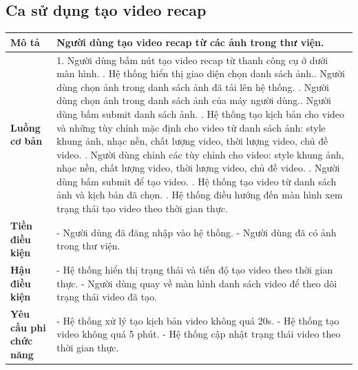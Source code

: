 \subsection{Ca sử dụng tạo video recap}

\vspace{0.5cm}

\noindent 
\begin{tabularx}{\linewidth}{| l | X |} 
\hline 
\textbf{Mô tả} & Người dùng tạo video recap từ các ảnh trong thư viện. \\
\hline 
\textbf{Luồng cơ bản} & 1. Người dùng bấm nút tạo video recap từ thanh công cụ ở dưới màn hình. \newline
                       2. Hệ thống hiển thị giao diện chọn danh sách ảnh.\newline
                       3. Người dùng chọn ảnh trong danh sách ảnh đã tải lên hệ thống. \newline
                       4. Người dùng chọn ảnh trong danh sách ảnh của máy người dùng.\newline
                       5. Người dùng bấm submit danh sách ảnh. \newline
                       6. Hệ thống tạo kịch bản cho video và những tùy chỉnh mặc định cho video từ danh sách ảnh: style khung ảnh, nhạc nền, chất lượng video, thời lượng video, chủ đề video. \newline
                       7. Người dùng chỉnh các tùy chỉnh cho video: style khung ảnh, nhạc nền, chất lượng video, thời lượng video, chủ đề video. \newline
                       8. Người dùng bấm submit để tạo video. \newline
                       9. Hệ thống tạo video từ danh sách ảnh và kịch bản đã chọn. \newline
                       10. Hệ thống điều hướng đến màn hình xem trạng thái tạo video theo thời gian thực. \\
\hline 
\textbf{Tiền điều kiện} & - Người dùng đã đăng nhập vào hệ thống. \newline
                            - Người dùng đã có ảnh trong thư viện. \\
\hline
\textbf{Hậu điều kiện} & - Hệ thống hiển thị trạng thái và tiến độ tạo video theo thời gian thực. \newline
                         - Người dùng quay về màn hình danh sách video để theo dõi trạng thái video đã tạo. \\
\hline 
\textbf{Yêu cầu phi chức năng} & - Hệ thống xử lý tạo kịch bản video không quá 20s. \newline 
                                 - Hệ thống tạo video không quá 5 phút. \newline
                                 - Hệ thống cập nhật trạng thái video theo thời gian thực. \\
\hline 
\end{tabularx}

